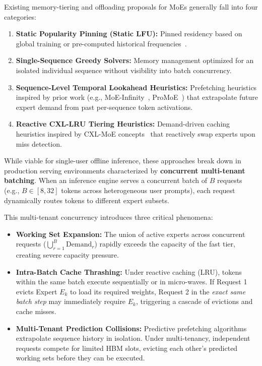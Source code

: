 \documentclass[10pt,journal,compsoc]{IEEEtran}
\begin{document}
Existing memory-tiering and offloading proposals for MoEs generally fall into four categories:
\begin{enumerate}
    \item \textbf{Static Popularity Pinning (Static LFU):} Pinned residency based on global training or pre-computed historical frequencies~\cite{rajbhandari2022deepspeed}.
    \item \textbf{Single-Sequence Greedy Solvers:} Memory management optimized for an isolated individual sequence without visibility into batch concurrency.
    \item \textbf{Sequence-Level Temporal Lookahead Heuristics:} Prefetching heuristics inspired by prior work (e.g., MoE-Infinity~\cite{fu2024moeinfinity}, ProMoE~\cite{promoe2025}) that extrapolate future expert demand from past per-sequence token activations.
    \item \textbf{Reactive CXL-LRU Tiering Heuristics:} Demand-driven caching heuristics inspired by CXL-MoE concepts~\cite{cxlmoe2023} that reactively swap experts upon miss detection.
\end{enumerate}

While viable for single-user offline inference, these approaches break down in production serving environments characterized by \textbf{concurrent multi-tenant batching}. When an inference engine serves a concurrent batch of $B$ requests (e.g., $B \in [8, 32]$ tokens across heterogeneous user prompts), each request dynamically routes tokens to different expert subsets. 

This multi-tenant concurrency introduces three critical phenomena:
\begin{itemize}
    \item \textbf{Working Set Expansion:} The union of active experts across concurrent requests ($\bigcup_{r=1}^B \text{Demand}_r$) rapidly exceeds the capacity of the fast tier, creating severe capacity pressure.
    \item \textbf{Intra-Batch Cache Thrashing:} Under reactive caching (LRU), tokens within the same batch execute sequentially or in micro-waves. If Request 1 evicts Expert $E_k$ to load its required weights, Request 2 in the \emph{exact same batch step} may immediately require $E_k$, triggering a cascade of evictions and cache misses.
    \item \textbf{Multi-Tenant Prediction Collisions:} Predictive prefetching algorithms extrapolate sequence history in isolation. Under multi-tenancy, independent requests compete for limited HBM slots, evicting each other's predicted working sets before they can be executed.
\end{itemize}
\end{document}
